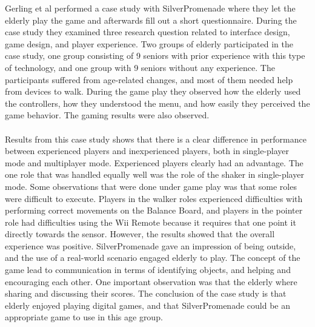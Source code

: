 Gerling et al performed a case study with SilverPromenade where they let the elderly play the game and afterwards fill out a short questionnaire. During the case study they examined three research question related to interface design, game design, and player experience. Two groups of elderly participated in the case study, one group consisting of 9 seniors with prior experience with this type of  technology, and one group with 9 seniors without any experience. The participants suffered from age-related changes, and most of them needed help from devices to walk. During the game play they observed how the elderly used the controllers, how they understood the menu, and how easily they perceived the game behavior. The gaming results were also observed. \\ \\
Results from this case study shows that there is a clear difference in performance between experienced players and inexperienced players, both in single-player mode and multiplayer mode. Experienced players clearly had an advantage. The one role that was handled equally well was the role of the shaker in single-player mode. Some observations that were done under game play was that some roles were difficult to execute. Players in the walker roles experienced difficulties with performing correct movements on the Balance Board, and players in the pointer role had difficulties using the Wii Remote because it requires that one point it directly towards the sensor. However, the results showed that the overall experience was positive. SilverPromenade gave an impression of being outside, and the use of a real-world scenario engaged elderly to play. The concept of the game lead to communication in terms of identifying objects, and helping and encouraging each other. One important observation was that the elderly where sharing and discussing their scores. The conclusion of the case study is that elderly enjoyed playing digital games, and that SilverPromenade could be an appropriate game to use in this age group. 